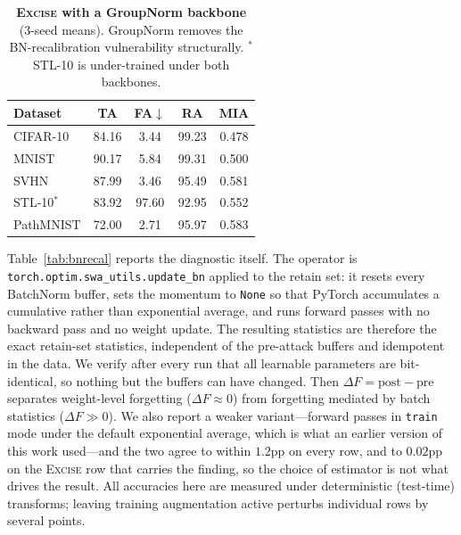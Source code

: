 \documentclass{article}
\newcommand{\ours}{\textsc{Excise}}
\theoremstyle{remark}
\theoremstyle{plain}
\begin{document}
\begin{table}[t]
\centering
\caption{\textbf{\ours{} with a GroupNorm backbone} (3-seed means). GroupNorm
removes the BN-recalibration vulnerability structurally. $^*$STL-10 is under-trained under
both backbones.}
\label{tab:gn}
\begin{tabular}{@{}lcccc@{}}
\toprule
\textbf{Dataset} & \textbf{TA} & \textbf{FA}$\downarrow$ & \textbf{RA} & \textbf{MIA} \\
\midrule
CIFAR-10    & 84.16 & 3.44 & 99.23 & 0.478 \\
MNIST       & 90.17 & 5.84 & 99.31 & 0.500 \\
SVHN        & 87.99 & 3.46 & 95.49 & 0.581 \\
STL-10$^*$  & 83.92 & 97.60 & 92.95 & 0.552 \\
PathMNIST   & 72.00 & 2.71 & 95.97 & 0.583 \\
\bottomrule
\end{tabular}
\end{table}

Table~\ref{tab:bnrecal} reports the diagnostic itself. The operator is
\texttt{torch.optim.swa\_utils.update\_bn} applied to the retain set: it resets
every BatchNorm buffer, sets the momentum to \texttt{None} so that PyTorch
accumulates a cumulative rather than exponential average, and runs forward
passes with no backward pass and no weight update. The resulting statistics are
therefore the exact retain-set statistics, independent of the pre-attack buffers
and idempotent in the data. We verify after every run that all learnable
parameters are bit-identical, so nothing but the buffers can have changed. Then
$\Delta F = \mathrm{post} - \mathrm{pre}$ separates weight-level forgetting
($\Delta F \approx 0$) from forgetting mediated by batch statistics
($\Delta F \gg 0$). We also report a weaker variant---forward passes in
\texttt{train} mode under the default exponential average, which is what an
earlier version of this work used---and the two agree to within $1.2$pp on every
row, and to $0.02$pp on the \ours{} row that carries the finding, so the choice
of estimator is not what drives the result. All
accuracies here are measured under deterministic (test-time) transforms; leaving
training augmentation active perturbs individual rows by several points.
\end{document}
